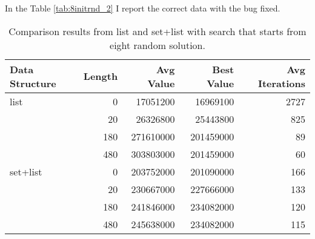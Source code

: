 	In the Table \ref{tab:8initrnd_2} I report the correct data with the bug fixed.
	
	\begin{table}[]
		\centering
		\begin{tabular}{lrrrr}
			\toprule
			\textbf{Data Structure} & \textbf{Length} & \textbf{Avg Value} & \textbf{Best Value} & \textbf{Avg Iterations} \\
			\midrule
			list                    & 0               & 17051200           & 16969100            & 2727                    \\
			& 20              & 26326800           & 25443800            & 825                     \\
			& 180             & 271610000          & 201459000           & 89                      \\
			& 480             & 303803000          & 201459000           & 60                      \\
			\midrule
			set+list                & 0               & 203752000          & 201090000           & 166                     \\
			& 20              & 230667000          & 227666000           & 133                     \\
			& 180             & 241846000          & 234082000           & 120                     \\
			& 480             & 245638000          & 234082000           & 115   \\
			\bottomrule                 
		\end{tabular}
		\caption{Comparison results from list and set+list with search that starts from eight random solution.}
		\label{tab:8initrnd_1}
	\end{table}

